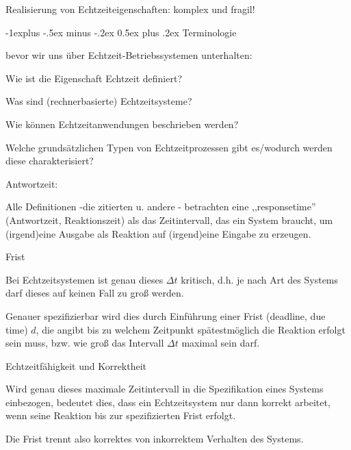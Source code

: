 \documentclass[a4paper]{article}
\makeatletter
\renewcommand{\subsection}{\@startsection{subsection}{2}{0mm}%
 {-1explus -.5ex minus -.2ex}%
 {0.5ex plus .2ex}%
 {\normalfont\normalsize\bfseries}}
\makeatother
\begin{document}
\begin{multicols}{3}
    Realisierung von Echtzeiteigenschaften: komplex und fragil!


    \subsection{Terminologie}

    bevor wir uns über Echtzeit-Betriebssystemen unterhalten:

    \begin{enumerate*}
        \item
        Wie ist die Eigenschaft Echtzeit definiert?
        \item
        Was sind (rechnerbasierte) Echtzeitsysteme?
        \item
        Wie können Echtzeitanwendungen beschrieben werden?
        \item
        Welche grundsätzlichen Typen von Echtzeitprozessen gibt es/wodurch
        werden diese charakterisiert?
    \end{enumerate*}

    Antwortzeit:

    \begin{itemize*}
        \item
        Alle Definitionen -die zitierten u. andere - betrachten eine
        ,,responsetime'' (Antwortzeit, Reaktionszeit) als das Zeitintervall,
        das ein System braucht, um (irgend)eine Ausgabe als Reaktion auf
        (irgend)eine Eingabe zu erzeugen.
    \end{itemize*}

    Frist

    \begin{itemize*}
        \item
        Bei Echtzeitsystemen ist genau dieses $\Delta t$
        kritisch, d.h. je nach Art des Systems darf dieses auf keinen Fall zu
        groß werden.
        \item
        Genauer spezifizierbar wird dies durch Einführung einer Frist
        (deadline, due time) $d$, die angibt bis zu welchem Zeitpunkt
        spätestmöglich die Reaktion erfolgt sein muss, bzw. wie groß das
        Intervall $\Delta t$ maximal sein darf.
    \end{itemize*}

    Echtzeitfähigkeit und Korrektheit

    \begin{itemize*}
        \item
        Wird genau dieses maximale Zeitintervall in die Spezifikation eines
        Systems einbezogen, bedeutet dies, dass ein Echtzeitsystem nur dann
        korrekt arbeitet, wenn seine Reaktion bis zur spezifizierten Frist
        erfolgt.
        \item
        Die Frist trennt also korrektes von inkorrektem Verhalten des Systems.
    \end{itemize*}


\end{multicols}
\end{document}
